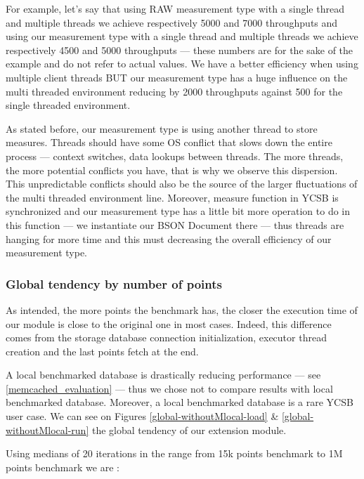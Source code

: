 \documentclass[a4paper,11pt]{report}
\begin{document}
For example, let's say that using RAW measurement type with a single thread and multiple threads  we achieve respectively 5000 and 7000 throughputs and using our measurement type with a single thread and multiple threads we achieve respectively 4500 and 5000 throughputs --- these numbers are for the sake of the example and do not refer to actual values. We have a better efficiency when using multiple client threads BUT our measurement type has a huge influence on the multi threaded environment reducing by 2000 throughputs against 500 for the single threaded environment.

As stated before, our measurement type is using another thread to store measures. Threads should have some OS conflict that slows down the entire process --- context switches, data lookups between threads. The more threads, the more potential conflicts you have, that is why we observe this dispersion. This unpredictable conflicts should also be the source of the larger fluctuations of the multi threaded environment line.
Moreover, measure function in YCSB is synchronized and our measurement type has a little bit more operation to do in this function --- we instantiate our BSON Document there --- thus threads are hanging for more time and this must decreasing the overall efficiency of our measurement type.

\clearpage

\subsubsection{Global tendency by number of points}

As intended, the more points the benchmark has, the closer the execution time of our module is close to the original one in most cases. Indeed, this difference comes from the storage database connection initialization, executor thread creation and the last points fetch at the end. 

\bigskip

A local benchmarked database is drastically reducing performance --- see \ref{memcached_evaluation} --- thus we chose not to compare results with local benchmarked database. Moreover, a local benchmarked database is a rare YCSB user case. We can see on Figures \ref{global-withoutMlocal-load} \&  \ref{global-withoutMlocal-run} the global tendency of our extension module.

Using medians of 20 iterations in the range from 15k points benchmark to 1M points benchmark we are :
\end{document}
